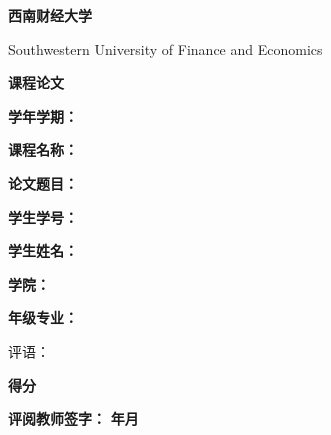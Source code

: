 \documentclass{ctexart}
\begin{document}
    \thispagestyle{empty}
    \begin{center}
        {\bfseries\kaishu 西南财经大学}

        { Southwestern University of Finance and Economics}

        {\bfseries\heiti 课程论文}

        
        
        {
            \textbf{学年学期：}\uline{\hspace{1em}\hfill} \makebox[0.46em]{}\par
            \textbf{课程名称：}\uline{\hspace{1em}\hfill} \makebox[0.46em]{}\par
            \textbf{论文题目：}\uline{\hspace{1em}\hfill} \makebox[0.46em]{}\par
            \textbf{学生学号：}\uline{\hspace{1em}\hfill} \makebox[0.46em]{}\par
            \textbf{学生姓名：}\uline{\hspace{1em}\hfill} \makebox[0.46em]{}\par
            \textbf{学\hspace{2em}院：}\uline{\hspace{1em}\hfill} \makebox[0.46em]{}\par
            \textbf{年级专业：}\uline{\hspace{1em}\hfill} \makebox[0.46em]{}\par
        }
    \end{center}
    {评语：}

    {\bfseries 得\hspace{1em}分}

    {\bfseries 评阅教师签字：}
    {\bfseries 年\quad 月}
\end{document}
